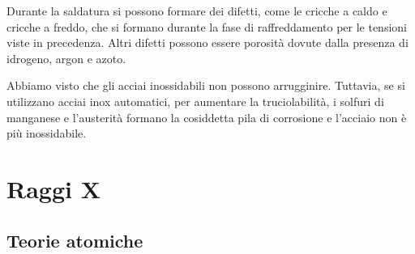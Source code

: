 Durante la saldatura si possono formare dei difetti, come le cricche a caldo e cricche a freddo, che si formano durante la fase di raffreddamento per le tensioni viste in precedenza. Altri difetti possono essere porosità dovute dalla presenza di idrogeno, argon e azoto.

Abbiamo visto che gli acciai inossidabili non possono arrugginire. Tuttavia, se si utilizzano acciai inox automatici, per aumentare la truciolabilità, i solfuri di manganese e l’austerità formano la cosiddetta pila di corrosione e l’acciaio non è più inossidabile.

\section{Raggi X}
\subsection{Teorie atomiche}

